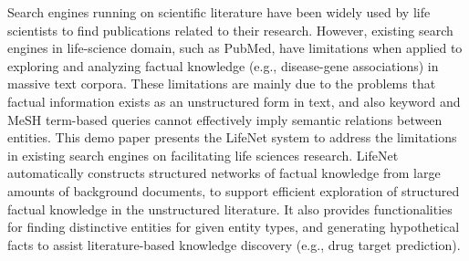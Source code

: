 Search engines running on scientific literature have been widely used by life scientists to find publications related to their research. However, existing search engines in life-science domain, such as PubMed, have limitations when applied to exploring and analyzing factual knowledge (e.g., disease-gene associations) in massive text corpora. These limitations are mainly due to the problems that factual information exists as an unstructured form in text, and also keyword and MeSH term-based queries cannot effectively imply semantic relations between entities. This demo paper presents the LifeNet system to address the limitations in existing search engines on facilitating life sciences research. LifeNet automatically constructs structured networks of factual knowledge from large amounts of background documents, to support efficient exploration of structured factual knowledge in the unstructured literature. It also provides functionalities for finding distinctive entities for given entity types, and generating hypothetical facts to assist literature-based knowledge discovery (e.g., drug target prediction).
